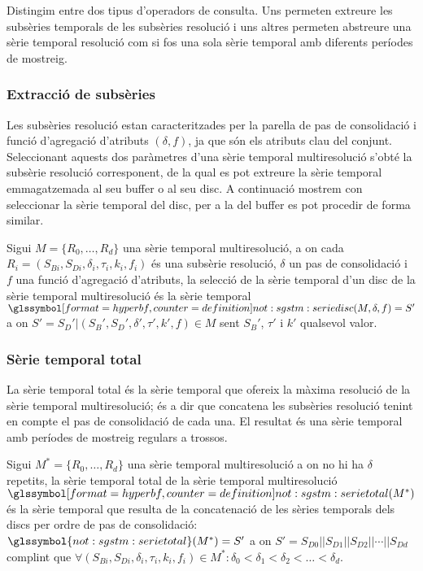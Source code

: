 Distingim entre dos tipus d'operadors de consulta. Uns permeten
extreure les subsèries temporals de les subsèries resolució i uns altres
permeten abstreure una sèrie temporal resolució com si fos una sola
sèrie temporal amb diferents períodes de mostreig.


\subsubsection{Extracció de subsèries}


Les subsèries resolució estan caracteritzades per la parella de pas de
consolidació i funció d'agregació d'atributs $(\delta,f)$, ja que són
els atributs clau del conjunt. Seleccionant aquests dos paràmetres
d'una sèrie temporal multiresolució s'obté la subsèrie resolució
corresponent, de la qual es pot extreure la sèrie temporal
emmagatzemada al seu buffer o al seu disc. A continuació mostrem con
seleccionar la sèrie temporal del disc, per a la del buffer es pot
procedir de forma similar.

\begin{definition}
  Sigui $M=\{R_0,\dotsc,R_{d}\}$ una sèrie temporal multiresolució, a
  on cada $R_i=(S_{Bi},S_{Di},\delta_i,\tau_i,k_i,f_i)$ és una
  subsèrie resolució, $\delta$ un pas de consolidació i $f$ una funció
  d'agregació d'atributs, la selecció de la sèrie temporal d'un disc
  de la sèrie temporal multiresolució és la sèrie temporal
  $\glssymboldef{not:sgstm:seriedisc}(M,\delta,f)= S'$ a on $S'= S_D' |
  (S_B',S_D',\delta',\tau',k',f) \in M$ sent $S_B'$, $\tau'$ i $k'$ qualsevol
  valor.
\end{definition}




\subsubsection{Sèrie temporal total}




La sèrie temporal total és la sèrie temporal que ofereix la màxima
resolució de la sèrie temporal multiresolució; és a dir que concatena
les subsèries resolució tenint en compte el pas de consolidació de
cada una. El resultat és una sèrie temporal amb períodes de mostreig
regulars a trossos.
\begin{definition}
  Sigui $M^*=\{R_0,\dotsc,R_{d}\}$ una sèrie temporal multiresolució a
  on no hi ha $\delta$ repetits, la sèrie temporal total de la sèrie
  temporal multiresolució $\glssymboldef{not:sgstm:serietotal}(M^*)$
  és la sèrie temporal que resulta de la concatenació de les sèries
  temporals dels discs per ordre de pas de consolidació:
  $\glssymbol{not:sgstm:serietotal}(M^*)=S'$ a on $S'= S_{D0} ||
  S_{D1} || S_{D2} || \dotsb || S_{Dd}$ complint que $\forall
  (S_{Bi},S_{Di},\delta_i,\tau_i,k_i,f_i) \in M^* : \delta_0 <
  \delta_1 < \delta_2 < \dots < \delta_d$.
\end{definition}

